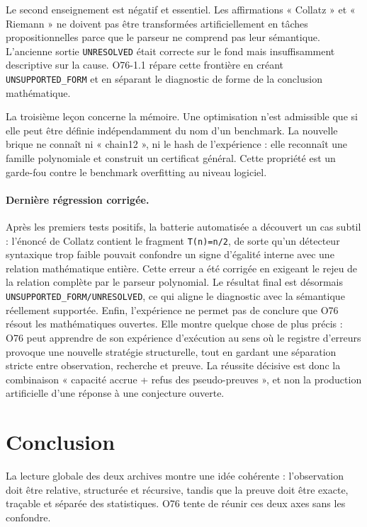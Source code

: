 \documentclass[11pt,a4paper]{article}
\begin{document}
Le second enseignement est négatif et essentiel. Les affirmations « Collatz » et « Riemann » ne doivent pas être transformées artificiellement en tâches propositionnelles parce que le parseur ne comprend pas leur sémantique. L'ancienne sortie \texttt{UNRESOLVED} était correcte sur le fond mais insuffisamment descriptive sur la cause. O76-1.1 répare cette frontière en créant \texttt{UNSUPPORTED\_FORM} et en séparant le diagnostic de forme de la conclusion mathématique.

La troisième leçon concerne la mémoire. Une optimisation n'est admissible que si elle peut être définie indépendamment du nom d'un benchmark. La nouvelle brique ne connaît ni « chain12 », ni le hash de l'expérience : elle reconnaît une famille polynomiale et construit un certificat général. Cette propriété est un garde-fou contre le benchmark overfitting au niveau logiciel.


\paragraph{Dernière régression corrigée.} Après les premiers tests positifs, la batterie automatisée a découvert un cas subtil : l'énoncé de Collatz contient le fragment \texttt{T(n)=n/2}, de sorte qu'un détecteur syntaxique trop faible pouvait confondre un signe d'égalité interne avec une relation mathématique entière. Cette erreur a été corrigée en exigeant le rejeu de la relation complète par le parseur polynomial. Le résultat final est désormais \texttt{UNSUPPORTED\_FORM/UNRESOLVED}, ce qui aligne le diagnostic avec la sémantique réellement supportée.
Enfin, l'expérience ne permet pas de conclure que O76 résout les mathématiques ouvertes. Elle montre quelque chose de plus précis : O76 peut apprendre de son expérience d'exécution au sens où le registre d'erreurs provoque une nouvelle stratégie structurelle, tout en gardant une séparation stricte entre observation, recherche et preuve. La réussite décisive est donc la combinaison « capacité accrue + refus des pseudo-preuves », et non la production artificielle d'une réponse à une conjecture ouverte.

\section{Conclusion}
La lecture globale des deux archives montre une idée cohérente : l'observation doit être relative, structurée et récursive, tandis que la preuve doit être exacte, traçable et séparée des statistiques. O76 tente de réunir ces deux axes sans les confondre.
\end{document}
